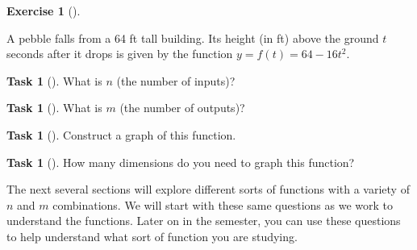 \documentclass[10pt,]{book}
\theoremstyle{plain}
\theoremstyle{definition}
\theoremstyle{definition}
\theoremstyle{definition}
\theoremstyle{definition}
\newtheorem{exploration}[project]{Exercise}
\newtheorem{task}[project]{Task}
\theoremstyle{definition}
\numberwithin{equation}{section}
\begin{document}
\begin{exploration}[]\label{prob_pebble}
%
\par
A pebble falls from a 64 ft tall building. Its height (in ft) above the ground \(t\) seconds after it drops is given by the function \(y=f(t)=64-16t^2\).%
\begin{task}[]\label{task-165}
What is \(n\) (the number of inputs)?%
\end{task}
\begin{task}[]\label{task-166}
What is \(m\) (the number of outputs)?%
\end{task}
\begin{task}[]\label{task-167}
Construct a graph of this function.%
\end{task}
\begin{task}[]\label{task-168}
How many dimensions do you need to graph this function?%
\end{task}
\end{exploration}
The next several sections will explore different sorts of functions with a variety of \(n\) and \(m\) combinations. We will start with these same questions as we work to understand the functions. Later on in the semester, you can use these questions to help understand what sort of function you are studying.%
\typeout{************************************************}
\typeout{************************************************}
\end{document}

